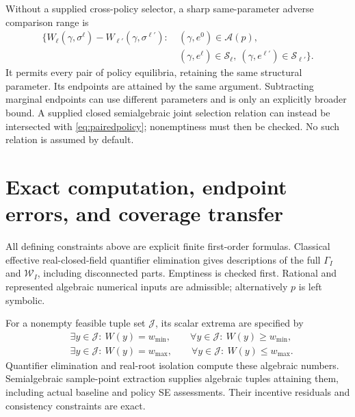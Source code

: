 \documentclass[11pt,a4paper]{article}
\numberwithin{equation}{section}
\theoremstyle{definition}
\begin{document}
Without a supplied cross-policy selector, a sharp same-parameter
adverse comparison range is
\begin{equation}\label{eq:pairedpolicy}
 \begin{split}
 \{W_\ell(\gamma,\sigma^\ell)-W_{\ell'}(\gamma,\sigma^{\ell'}):\
 &(\gamma,e^0)\in\mathcal A(p),\\
 &(\gamma,e^\ell)\in\mathcal S_\ell,\
   (\gamma,e^{\ell'})\in\mathcal S_{\ell'}\}.
 \end{split}
\end{equation}
It permits every pair of policy equilibria, retaining the same
structural parameter. Its endpoints are attained by the same argument.
Subtracting marginal endpoints can use different parameters and
is only an explicitly broader bound. A supplied closed semialgebraic
joint selection relation can instead be intersected with
\eqref{eq:pairedpolicy}; nonemptiness must then be checked.
No such relation is assumed by default.

\section{Exact computation, endpoint errors, and coverage transfer}
\label{sec:qe}
All defining constraints above are explicit finite first-order formulas.
Classical effective real-closed-field quantifier elimination
\cite{Basu} gives descriptions of the full \(\Gamma_I\) and
\(\mathcal W_I\), including disconnected parts.
Emptiness is checked first. Rational and represented algebraic
numerical inputs are admissible; alternatively \(p\) is left symbolic.

For a nonempty feasible tuple set \(\mathcal J\), its scalar extrema
are specified by
\begin{equation}\label{eq:endpointformula}
 \begin{aligned}
 &\exists y\in\mathcal J:\ W(y)=w_{\min},\qquad
   \forall y\in\mathcal J:\ W(y)\ge w_{\min},\\
 &\exists y\in\mathcal J:\ W(y)=w_{\max},\qquad
   \forall y\in\mathcal J:\ W(y)\le w_{\max}.
 \end{aligned}
\end{equation}
Quantifier elimination and real-root isolation compute these algebraic
numbers. Semialgebraic sample-point extraction supplies algebraic
tuples attaining them, including actual baseline and policy SE
assessments. Their incentive residuals and consistency constraints
are exact.
\end{document}
